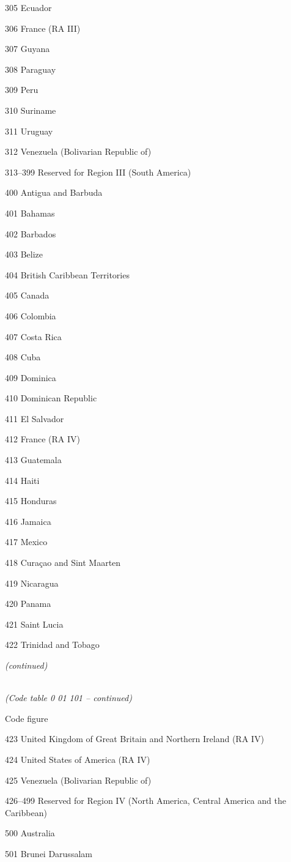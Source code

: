 305 Ecuador

306 France (RA III)

307 Guyana

308 Paraguay

309 Peru

310 Suriname

311 Uruguay

312 Venezuela (Bolivarian Republic of)

313--399 Reserved for Region III (South America)

400 Antigua and Barbuda

401 Bahamas

402 Barbados

403 Belize

404 British Caribbean Territories

405 Canada

406 Colombia

407 Costa Rica

408 Cuba

409 Dominica

410 Dominican Republic

411 El Salvador

412 France (RA IV)

413 Guatemala

414 Haiti

415 Honduras

416 Jamaica

417 Mexico

418 Curaçao and Sint Maarten

419 Nicaragua

420 Panama

421 Saint Lucia

422 Trinidad and Tobago

\emph{(continued)}

\emph{\\
(Code table 0 01 101 -- continued)}

Code figure

423 United Kingdom of Great Britain and Northern Ireland (RA IV)

424 United States of America (RA IV)

425 Venezuela (Bolivarian Republic of)

426--499 Reserved for Region IV (North America, Central America and the Caribbean)

500 Australia

501 Brunei Darussalam

